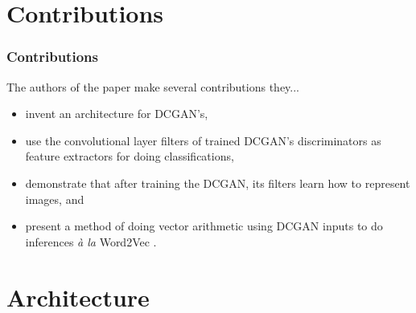 \documentclass{beamer}
\begin{document}

\section{Contributions}
\begin{frame}
\frametitle{Contributions}

The authors of the paper make several contributions they...
\begin{itemize}
  \item invent an architecture for DCGAN's,
  \item use the convolutional layer filters of trained DCGAN's discriminators as 
    feature extractors for doing classifications,
  \item demonstrate that after training the DCGAN, its filters learn how to
    represent images, and
  \item present a method of doing vector arithmetic using DCGAN inputs to do 
    inferences \emph{{\`a} la} Word2Vec \cite{word2Vec}.
\end{itemize}
\end{frame}

\section{Architecture}
\end{document}
